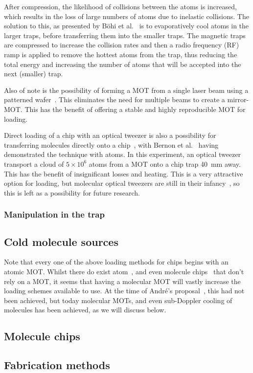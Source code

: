 After compression, the likelihood of collisions between the atoms is increased,
which results in the loss of large numbers of atoms due to inelastic collisions.
The solution to this, as presented by B\"ohi et al.~\cite{Boehi2009} is to
evaporatively cool atoms in the larger traps, before transferring them into the
smaller traps. The magnetic traps are compressed to increase the collision
rates and then a radio frequency (RF) ramp is applied to remove the hottest
atoms from the trap, thus reducing the total energy and increasing the number of
atoms that will be accepted into the next (smaller) trap.~\cite{Foot2005,
Metcalf1999}

Also of note is the possibility of forming a MOT from a single laser beam using
a patterned wafer~\cite{Nshii2013}. This eliminates the need for multiple beams
to create a mirror-MOT. This has the benefit of offering a stable and highly
reproducible MOT for loading.

Direct loading of a chip with an optical tweezer is also a possibility for
transferring molecules directly onto a chip~\cite{Liueaar7797}, with Bernon et
al.~\cite{Bernon2013} having demonstrated the technique with atoms. In this
experiment, an optical tweezer transport a cloud of $5\times10^6$ 
atoms from a MOT onto a chip trap \SI{40}{\milli\metre} away. This has the
benefit of insignificant losses and heating. This is a very attractive option
for loading, but molecular optical tweezers are still in their
infancy~\cite{Anderegg2019}, so this is left as a possibility for future
research.

\subsubsection{Manipulation in the trap}


\subsection{Cold molecule sources}

Note that every one  of the above loading methods for
chips begins with an atomic MOT. Whilst there do exist atom~\cite{Dekker2000},
and even molecule chips~\cite{Bethlem2000. Meek2008} that don't rely on a MOT,
it seems that having a molecular MOT will vastly increase the loading schemes
available to use. At the time of Andr\'e's proposal~\cite{Andre2006}, this had
not been achieved, but today molecular MOTs, and even sub-Doppler cooling of
molecules has been achieved, as we will discuss below.

\subsection{Molecule chips}

\subsection{Fabrication methods}

